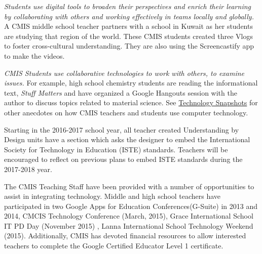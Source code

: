 \begin{findings}
\textit{Students use digital tools to broaden their perspectives and
enrich their learning by collaborating with others and working
effectively in teams locally and globally.} A CMIS middle school teacher partners with a school in Kuwait as her students are studying that region of the world.  These CMIS students  created three Vlogs to foster cross-cultural understanding.  They are also using the Screencastify app to make the videos.

\textit{CMIS Students use collaborative technologies to work with others, to examine issues.} For example, high school chemistry students are reading the informational text, \textit{Stuff Matters} and have organized a Google Hangouts session with the author to discuss topics related to material science. See \href{https://docs.google.com/a/cmis.ac.th/document/d/15hsNNTonRewyDmMCelG2aVxweUJhej15h627tCAQBXg/edit?usp=sharing}{Technology Snapshots} for other anecdotes on how CMIS teachers and students use computer technology. 


Starting in the 2016-2017 school year, all teacher created Understanding by Design units have a section which asks the designer to embed the International Society for Technology in Education (ISTE) standards. Teachers will be encouraged to reflect on previous plans to embed ISTE standards during the 2017-2018 year.  


The CMIS Teaching Staff have been provided with a number of opportunities to assist in integrating technology. Middle and high school teachers have participated in two Google Apps for Education Conferences(G-Suite) in 2013 and 2014, CMCIS Technology Conference (March, 2015), Grace International School IT PD Day (November 2015) , Lanna International School Technology Weekend (2015). Additionally, CMIS has devoted financial resources to allow interested teachers to complete the Google Certified Educator Level 1 certificate. 



\end{findings}
